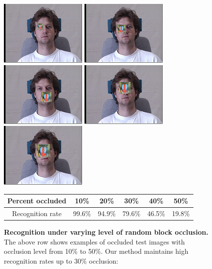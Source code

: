 \documentclass[12pt,journal,draftcls,letterpaper,onecolumn]{IEEEtran}
\begin{document}
\begin{figure}[t]
\centering
\includegraphics[scale=0.75,clip=true]{figures_pami/multipie_occ/occ10.png}
\includegraphics[scale=0.75,clip=true]{figures_pami/multipie_occ/occ20.png}
\includegraphics[scale=0.75,clip=true]{figures_pami/multipie_occ/occ30.png}
\includegraphics[scale=0.75,clip=true]{figures_pami/multipie_occ/occ40.png}
\includegraphics[scale=0.75,clip=true]{figures_pami/multipie_occ/occ50.png}
\vspace{-.25in}
\caption{{\bf Recognition under varying level of
random block occlusion.} The above row shows examples of occluded test images with occlusion level from 10\% to 50\%. Our method maintains high recognition rates up to 30\% occlusion:} 
\vspace{3mm}
{\small
\begin{tabular}{|c|c|c|c|c|c| }
\hline
Percent occluded & 10\% & 20\% & 30\% & 40\% & 50\%  \\
\hline
\hline
Recognition rate & 99.6\% & 94.9\% & 79.6\% & 46.5\% & 19.8\% \\
\hline
\end{tabular}
}
\label{fig:multipie-occ-rec}
\vspace{-.25in}
\end{figure}
\end{document}
